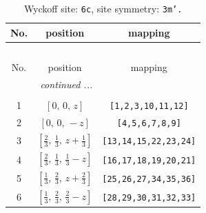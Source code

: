 \documentclass[fleqn,8pt]{jsarticle}
\begin{document}
\renewcommand{\arraystretch}{1.2}
\begin{longtable}{ccc}
\caption{Wyckoff site: {\tt 6c}, site symmetry: {\tt 3m'.}}
 \\
 \hline \hline
No. & position & mapping \\ \hline \endfirsthead

\multicolumn{2}{l}{\tablename\ \thetable{}} \\
 \hline \hline
No. & position & mapping \\ \hline \endhead

 \hline \hline
\multicolumn{2}{r}{\footnotesize\it continued ...} \\ \endfoot

 \hline \hline
\multicolumn{2}{r}{} \\ \endlastfoot

1 & $\left[ 0,\, 0,\, z \right]$ & {\tt [1,2,3,10,11,12]} \\ \hline
2 & $\left[ 0,\, 0,\, - z \right]$ & {\tt [4,5,6,7,8,9]} \\ \hline
3 & $\left[ \frac{2}{3},\, \frac{1}{3},\, z + \frac{1}{3} \right]$ & {\tt [13,14,15,22,23,24]} \\ \hline
4 & $\left[ \frac{2}{3},\, \frac{1}{3},\, \frac{1}{3} - z \right]$ & {\tt [16,17,18,19,20,21]} \\ \hline
5 & $\left[ \frac{1}{3},\, \frac{2}{3},\, z + \frac{2}{3} \right]$ & {\tt [25,26,27,34,35,36]} \\ \hline
6 & $\left[ \frac{1}{3},\, \frac{2}{3},\, \frac{2}{3} - z \right]$ & {\tt [28,29,30,31,32,33]} \\
\end{longtable}
\renewcommand{\arraystretch}{1.2}
\end{document}

